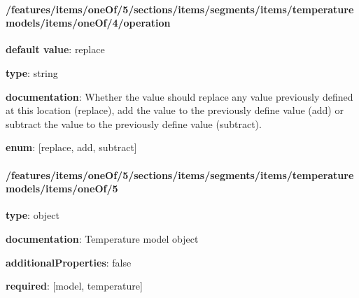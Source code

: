\begin{itemized}
\end{itemized}\paragraph{/features/items/oneOf/5/sections/items/segments/items/temperature models/items/oneOf/4/operation} \begin{itemized}
\item {\bf default value}: replace
\item {\bf type}: string
\item {\bf documentation}: Whether the value should replace any value previously defined at this location (replace), add the value to the previously define value (add) or subtract the value to the previously define value (subtract).
\item {\bf enum}: [replace, add, subtract]\end{itemized}\paragraph{/features/items/oneOf/5/sections/items/segments/items/temperature models/items/oneOf/5} \begin{itemized}
\item {\bf type}: object
\item {\bf documentation}: Temperature model object
\item {\bf additionalProperties}: false
\item {\bf required}: [model, temperature]\end{itemized}
